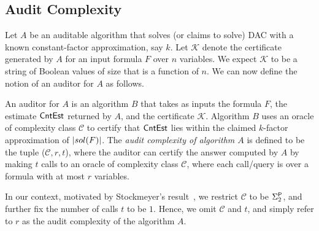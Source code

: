 

\subsection{Audit Complexity}











Let $A$ be an auditable algorithm that solves (or claims to solve) DAC
with a known constant-factor approximation, say $k$.  Let
$\mathcal{K}$ denote the certificate generated by $A$ for an input
formula $F$ over $n$ variables.  We expect $\mathcal{K}$ to be a
string of Boolean values of size that is a function of $n$.  We can
now define the notion of an auditor for $A$ as follows.

\begin{definition} An auditor for $A$ is an algorithm $B$ that
  takes as inputs the formula $F$,
  the estimate $\mathsf{CntEst}$ returned by $A$, and the
  certificate $\mathcal{K}$.  Algorithm $B$ uses an
  oracle of complexity class $\mathcal{C}$ to certify that $\mathsf{CntEst}$
  lies within the claimed $k$-factor approximation of $|sol({F})|$.  The {\em
    audit complexity of algorithm $A$} is defined to be the tuple ($\mathcal{C}, r, t$), where the auditor can certify the answer
  computed by $A$ by making $t$ calls to an oracle of complexity class
  $\mathcal{C}$, where each call/query is over a formula with at most
  $r$ variables.
\end{definition}
In our context, motivated by Stockmeyer's result~\cite{stockmeyer}, we restrict
$\mathcal{C}$ to be ${\Sigma_2^{\mathsf{P}}}$, and further fix the number of calls $t$ to be $1$. Hence, we omit $\mathcal{C}$ and $t$, and simply refer to $r$ as the audit complexity of the algorithm $A$.




